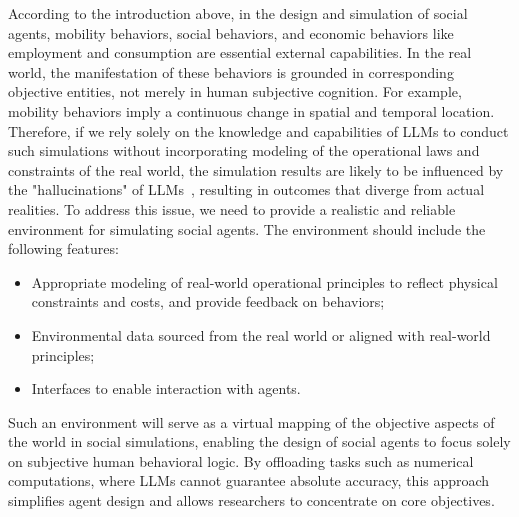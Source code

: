 According to the introduction above, in the design and simulation of social agents, mobility behaviors, social behaviors, and economic behaviors like employment and consumption are essential external capabilities.
In the real world, the manifestation of these behaviors is grounded in corresponding objective entities, not merely in human subjective cognition.
For example, mobility behaviors imply a continuous change in spatial and temporal location.
Therefore, if we rely solely on the knowledge and capabilities of LLMs to conduct such simulations without incorporating modeling of the operational laws and constraints of the real world, the simulation results are likely to be influenced by the "hallucinations" of LLMs~\cite{huang2023survey}, resulting in outcomes that diverge from actual realities.
To address this issue, we need to provide a realistic and reliable environment for simulating social agents.
The environment should include the following features:
\begin{itemize}
    \item Appropriate modeling of real-world operational principles to reflect physical constraints and costs, and provide feedback on behaviors;
    \item Environmental data sourced from the real world or aligned with real-world principles;
    \item Interfaces to enable interaction with agents.
\end{itemize}
Such an environment will serve as a virtual mapping of the objective aspects of the world in social simulations, enabling the design of social agents to focus solely on subjective human behavioral logic.
By offloading tasks such as numerical computations, where LLMs cannot guarantee absolute accuracy, this approach simplifies agent design and allows researchers to concentrate on core objectives.


